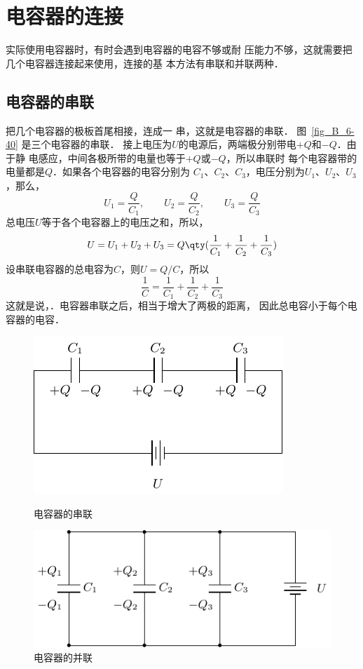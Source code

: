 \section{电容器的连接}
实际使用电容器时，有时会遇到电容器的电容不够或耐
压能力不够，这就需要把几个电容器连接起来使用，连接的基
本方法有串联和并联两种．
\subsection{电容器的串联}

把几个电容器的极板首尾相接，连成一
串，这就是电容器的串联．
图~\ref{fig_B_6-40} 是三个电容器的串联．
接上电压为$U$的电源后，两端极分别带电$+Q$和$-Q$．由于静
电感应，中间各极所带的电量也等于$+Q$或$-Q$，所以串联时
每个电容器带的电量都是$Q$．如果各个电容器的电容分别为
$C_1$、$C_2$、$C_3$，电压分别为$U_1$、$U_2$、$U_3$，那么，
\[ U_1=\frac{Q}{C_1},\qquad U_2=\frac{Q}{C_2},\qquad U_3=\frac{Q}{C_3}\]
总电压$U$等于各个电容器上的电压之和，所以，
\[U=U_1+U_2+U_3=Q\qty(\frac{1}{C_1}+\frac{1}{C_2}+\frac{1}{C_3})\]
设串联电容器的总电容为$C$，则$U=Q/C$，所以
\[\frac{1}{C}=\frac{1}{C_1}+\frac{1}{C_2}+\frac{1}{C_3}\]
这就是说，．电容器串联之后，相当于增大了两极的距离，
因此总电容小于每个电容器的电容．

\begin{figure}[htbp]
    \centering
    \begin{minipage}[t]{0.45\linewidth}
    	\centering
    	\includegraphics{fig/B/6-40.pdf}
    	\caption{电容器的串联}\label{fig_B_6-40}
    \end{minipage}
    \hfil
    \begin{minipage}[t]{0.45\linewidth}
    	\centering
    	\includegraphics{fig/B/6-41.pdf}
    	\caption{电容器的并联}\label{fig_B_6-41}
    \end{minipage}
\end{figure}



